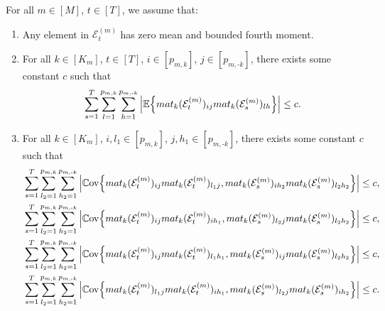 \documentclass[10pt,a4paper]{amsart}
\def\E{\mathbb{E}}
\def\cE{\mathcal{E}}
\def\cov{\mathbb{C}\mathrm{ov}}
\def\mat{\textnormal{\textsc{mat}}}
\begin{document}
\begin{assumption}\label{ass: noise}
For all $m\in[M]$, $t\in[T]$, we assume that:
\begin{enumerate}[itemsep=0pt, label = (\alph*), left = 0pt]
    \item Any element in $\cE_t^{(m)}$ has zero mean and bounded fourth moment.
    \item For all $k\in[K_m]$, $t\in[T]$, $i\in[p_{m,k}]$, $j\in[p_{m,\text{-}k}]$, there exists some constant $c$ such that
    \[
    \sum_{s=1}^T \sum_{l=1}^{p_{m,k}} \sum_{h=1}^{p_{m,\text{-}k}} \Big| \E\Big\{ \mat_k(\cE_t^{(m)})_{ij} \mat_k(\cE_s^{(m)})_{lh} \Big\} \Big| \leq c .
    \]
    \item For all $k\in[K_m]$, $i,l_1\in[p_{m,k}]$, $j,h_1\in[p_{m,\text{-}k}]$, there exists some constant $c$ such that
    {\small
    \begin{align*}
        & \sum_{s=1}^T \sum_{l_2=1}^{p_{m,k}} \sum_{h_2=1}^{p_{m,\text{-}k}} \Big| \cov\Big\{ \mat_k(\cE_t^{(m)})_{ij} \mat_k(\cE_t^{(m)})_{l_1 j} , \mat_k(\cE_s^{(m)})_{ih_2} \mat_k(\cE_s^{(m)})_{l_2 h_2} \Big\} \Big| \leq c, \\
        & \sum_{s=1}^T \sum_{l_2=1}^{p_{m,k}} \sum_{h_2=1}^{p_{m,\text{-}k}} \Big| \cov\Big\{ \mat_k(\cE_t^{(m)})_{ij} \mat_k(\cE_t^{(m)})_{i h_1} , \mat_k(\cE_s^{(m)})_{l_2 j} \mat_k(\cE_s^{(m)})_{l_2 h_2} \Big\} \Big| \leq c, \\
        & \sum_{s=1}^T \sum_{l_2=1}^{p_{m,k}} \sum_{h_2=1}^{p_{m,\text{-}k}} \Big| \cov\Big\{ \mat_k(\cE_t^{(m)})_{ij} \mat_k(\cE_t^{(m)})_{l_1 h_1} , \mat_k(\cE_s^{(m)})_{ij} \mat_k(\cE_s^{(m)})_{l_2 h_2} \Big\} \Big| \leq c, \\
        & \sum_{s=1}^T \sum_{l_2=1}^{p_{m,k}} \sum_{h_2=1}^{p_{m,\text{-}k}} \Big| \cov\Big\{ \mat_k(\cE_t^{(m)})_{l_1 j} \mat_k(\cE_t^{(m)})_{i h_1} , \mat_k(\cE_s^{(m)})_{l_2 j} \mat_k(\cE_s^{(m)})_{i h_2} \Big\} \Big| \leq c .
    \end{align*}
    }
\end{enumerate}
\end{assumption}
\end{document}
